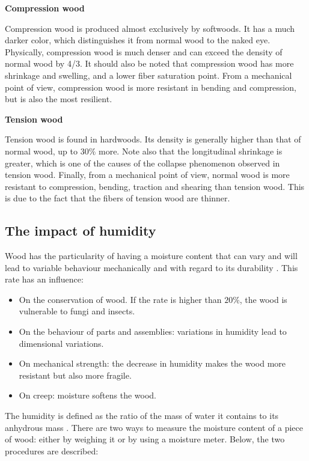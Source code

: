 \smallskip

\textbf{Compression wood}

Compression wood is produced almost exclusively by softwoods. It has a much darker color, which distinguishes it from normal wood to the naked eye. Physically, compression wood is much denser and can exceed the density of normal wood by 4/3. It should also be noted that compression wood has more shrinkage and swelling, and a lower fiber saturation point. From a mechanical point of view, compression wood is more resistant in bending and compression, but is also the most resilient.

\smallskip

\textbf{Tension wood}

Tension wood is found in hardwoods. Its density is generally higher than that of normal wood, up to $30 \%$ more. Note also that the longitudinal shrinkage is greater, which is one of the causes of the collapse phenomenon observed in tension wood. Finally, from a mechanical point of view, normal wood is more resistant to compression, bending, traction and shearing than tension wood. This is due to the fact that the fibers of tension wood are thinner.

\subsection{The impact of humidity}

Wood has the particularity of having a moisture content that can vary and will lead to variable behaviour mechanically and with regard to its durability \citep{zount2021}. This rate has an influence:

\begin{itemize}
	\item On the conservation of wood. If the rate is higher than $20 \%$, the wood is vulnerable to fungi and insects.
	\item On the behaviour of parts and assemblies: variations in humidity lead to dimensional variations.
	\item On mechanical strength: the decrease in humidity makes the wood more resistant but also more fragile.
	\item On creep: moisture softens the wood.
\end{itemize}

The humidity is defined as the ratio of the mass of water it contains to its anhydrous mass \citep{Nguyen2016phd}. There are two ways to measure the moisture content of a piece of wood: either by weighing it or by using a moisture meter. Below, the two procedures are described:

